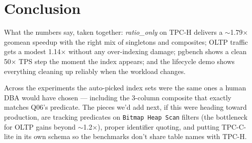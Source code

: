 \documentclass[10pt,a4paper]{article}
\newcommand{\code}[1]{\texttt{\small #1}}
\begin{document}
\section{Conclusion}

What the numbers say, taken together: \emph{ratio\_only} on TPC-H
delivers a $\sim$1.79$\times$ geomean speedup with the right mix of
singletons and composites; OLTP traffic gets a modest 1.14$\times$
without any over-indexing damage; pgbench shows a clean 50$\times$
TPS step the moment the index appears; and the lifecycle demo
shows everything cleaning up reliably when the workload changes.

Across the experiments the auto-picked index sets were the same ones
a human DBA would have chosen --- including the 3-column composite
that exactly matches Q06's predicate. The pieces we'd add next, if
this were heading toward production, are tracking predicates on
\code{Bitmap Heap Scan} filters (the bottleneck for OLTP gains
beyond $\sim$1.2$\times$), proper identifier quoting, and putting
TPC-C-lite in its own schema so the benchmarks don't share table
names with TPC-H.
\end{document}
